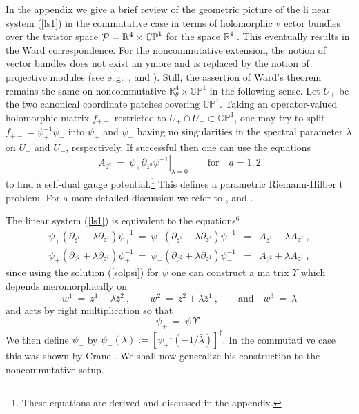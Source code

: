 \documentclass[a4paper,11pt,english]{article}
\numberwithin{equation}{section}
\renewcommand{\=}{\ =\ }
\begin{document}
In the appendix we give a brief review of the geometric picture of the li%
near system (\ref{ls1}) in the commutative case in terms of holomorphic v%
ector bundles over the twistor space $\mathcal{P}=\mathbb{R}^4\times\mathbb{%
CP}^1$ for the space $\mathbb{R}^4$ \cite{Atiyah:1977pw,WardWells}. 
This eventually results in the Ward correspondence. For the noncommutative 
extension, the notion of vector bundles does not exist an%
ymore and is replaced by the notion of projective modules (see e.\,g.\ \cite{%
Nekrasov:2000ih}, \cite{Douglas:2001ba} and \cite{Konechny:2001wz}). Still,
the assertion of Ward's theorem remains the same on noncommutative 
$\mathbb{R}^4_\theta\times\mathbb{CP}^1$ in the following sense. 
Let $U_\pm$ be the two canonical coordinate patches covering 
$\mathbb{CP}^1$.  Taking an operator-valued %
 holomorphic matrix $f_{+-}$ restricted to $U_+\cap U_-\subset\mathbb{CP}^1$,
one may try to split $f_{+-}=\psi^{-1}_+\psi_-$ into $\psi%
_+$ and $\psi_-$ having no singularities in the spectral parameter $\lambda$ 
on $U_+$ and $U_-$, respectively. If successful then one can use the equations
\begin{equation}\label{eqfa1}
 {A}_{\bar{z}^a}\=\left.\psi_+\partial_{\bar{z}^a}\psi^{-1}_+\right|%
_{\lambda=0}\qquad\text{for}\quad a=1,2
\end{equation}
to find a self-dual gauge potential.\footnote{These equations are derived %
 and discussed in the appendix.} This defines a parametric Riemann-Hilber%
t problem. For a more detailed discussion we refer to \cite{Kapustin:2000ek%
}, \cite{Takasaki:2000vs} and \cite{Lechtenfeld:2001ie}.%

The linear system (\ref{ls1}) is equivalent to the equations$^6$
\begin{subequations}\label{cooleq1}
\begin{eqnarray}
 \psi_+(\partial_{\bar{z}^1}-\lambda\partial_{z^2})\psi^{-1}_+ \=
 \psi_-(\partial_{\bar{z}^1}-\lambda\partial_{z^2})\psi^{-1}_- &=& 
 {A}_{\bar{z}^1}-\lambda {A}_{z^2}\ ,\\
 \psi_+(\partial_{\bar{z}^2}+\lambda\partial_{z^1})\psi^{-1}_+ \=
 \psi_-(\partial_{\bar{z}^2}+\lambda\partial_{z^1})\psi^{-1}_- &=&
 {A}_{\bar{z}^2}+\lambda {A}_{z^1}\ ,
\end{eqnarray}
\end{subequations}
since using the solution (\ref{solpsi}) for $\psi$  one can construct a ma%
trix $\Upsilon$ which depends meromorphically on 
\begin{equation}
w^1 \= z^1-\lambda\bar{z}^2\ ,\qquad w^2 \= z^2+\lambda\bar{z}^1\ ,
\qquad\text{and}\quad w^3\=\lambda
\end{equation}
and acts by right multiplication so that 
\begin{equation}
\psi_+\=\psi\,\Upsilon\ .
\end{equation}
We then define $\psi_-$ by $\psi%
_-(\lambda):=[\psi^{-1}_+(-1/\bar{\lambda})]^\dagger$. In the commutati%
ve case this was shown by Crane \cite{Crane:im}. We shall now generalize %
his construction to the noncommutative setup.
\end{document}
